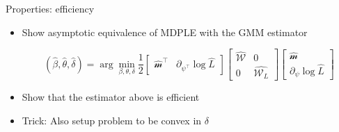 \documentclass[aspectratio=169,10pt]{beamer}
\begin{document}
\begin{frame}{Properties: efficiency}

\begin{itemize}
\item Show asymptotic equivalence of MDPLE with the GMM estimator

\begin{equation}
    (\hat{\beta},\hat{\theta},\hat{\delta}) = \arg\min_{\beta,\theta,\delta}\frac{1}{2}\begin{bmatrix}
\hat{\mathcal{m}}^\intercal & \partial_{\psi^\intercal}\log\hat{L}
\end{bmatrix}
\begin{bmatrix}
\hat{\mathcal{W}} & 0\\
0 & \hat{\mathcal{W}_L}
\end{bmatrix}
\begin{bmatrix}
\hat{\mathcal{m}} \\ \partial_{\psi}\log\hat{L}
\end{bmatrix}
\end{equation}

\item Show that the estimator above is efficient
\item  Trick: Also setup problem to be convex in $\delta$
\end{itemize}

\end{frame}
\end{document}
